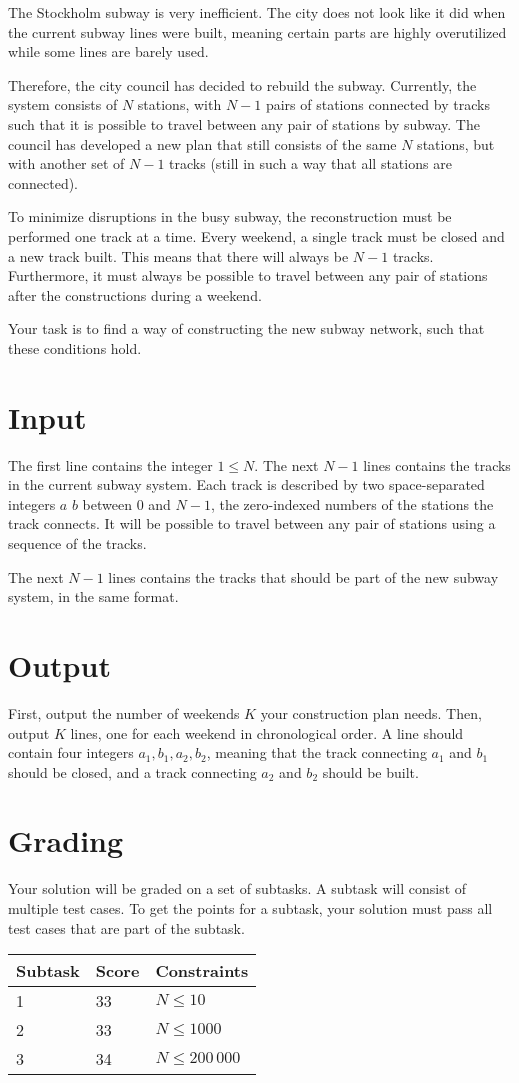 \def\version{1}
The Stockholm subway is very inefficient.
The city does not look like it did when the current subway lines were built, meaning certain parts are highly overutilized while some lines are barely used.

Therefore, the city council has decided to rebuild the subway.
Currently, the system consists of $N$ stations, with $N - 1$ pairs of stations connected by tracks such that it is possible to travel between any pair of stations by subway.
The council has developed a new plan that still consists of the same $N$ stations, but with another set of $N - 1$ tracks (still in such a way that all stations are connected).

To minimize disruptions in the busy subway, the reconstruction must be performed one track at a time.
Every weekend, a single track must be closed and a new track built.
This means that there will always be $N - 1$ tracks.
Furthermore, it must always be possible to travel between any pair of stations after the constructions during a weekend.

Your task is to find a way of constructing the new subway network, such that these conditions hold.

\section*{Input}
The first line contains the integer $1 \le N$.
The next $N - 1$ lines contains the tracks in the current subway system.
Each track is described by two space-separated integers $a$ $b$ between $0$ and $N - 1$, the zero-indexed numbers of the stations the track connects.
It will be possible to travel between any pair of stations using a sequence of the tracks.

The next $N - 1$ lines contains the tracks that should be part of the new subway system, in the same format.

\section*{Output}
First, output the number of weekends $K$ your construction plan needs.
Then, output $K$ lines, one for each weekend in chronological order.
A line should contain four integers $a_1, b_1, a_2, b_2$, meaning that the track connecting $a_1$ and $b_1$ should be closed, and a track connecting $a_2$ and $b_2$ should be built.

\section*{Grading}
Your solution will be graded on a set of subtasks.
A subtask will consist of multiple test cases.
To get the points for a subtask, your solution must pass all test cases that are part of the subtask.

\noindent
\begin{tabular}{| l | l | l |}
\hline
Subtask & Score & Constraints \\ \hline
1       & 33    & $N \le 10$ \\ \hline
2       & 33    & $N \le 1000$ \\ \hline
3       & 34    & $N \le 200\,000$ \\ \hline
\end{tabular}
